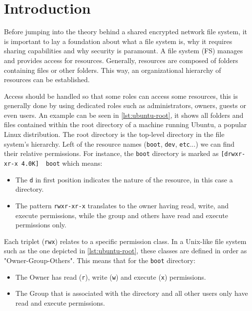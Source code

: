 \section*{Introduction}
Before jumping into the theory behind a shared encrypted network file system, it is important to lay a foundation about what a file system is, why it requires sharing capabilities and why security is paramount. A file system (FS) manages and provides access for resources. Generally, resources are composed of folders containing files or other folders. This way, an organizational hierarchy of resources can be established.
    


Access should be handled so that some roles can access some resources, this is generally done by using dedicated roles such as administrators, owners, guests or even users. An example can be seen in \autoref{lst:ubuntu-root}, it shows all folders and files contained within the root directory of a machine running Ubuntu, a popular Linux distribution. The root directory is the top-level directory in the file system's hierarchy. Left of the resource names (\lstinline{boot}, \lstinline{dev}, \lstinline{etc}...) we can find their relative permissions. For instance, the \lstinline{boot} directory is marked as \lstinline{[drwxr-xr-x 4.0K]  boot} which means:

\begin{itemize}
    \item The \lstinline{d} in first position indicates the nature of the resource, in this case a directory.
    \item The pattern \lstinline{rwxr-xr-x} translates to the owner having read, write, and execute permissions, while the group and others have read and execute permissions only.
\end{itemize}

Each triplet (\lstinline{rwx}) relates to a specific permission class. In a Unix-like file system such as the one depicted in \autoref{lst:ubuntu-root}, these classes are defined in order as "Owner-Group-Others". This means that for the \lstinline{boot} directory:

\begin{itemize}
    \item The Owner has read (\lstinline{r}), write (\lstinline{w}) and execute (\lstinline{x}) permissions.
    \item The Group that is associated with the directory and all other users only have read and execute permissions.
\end{itemize}

